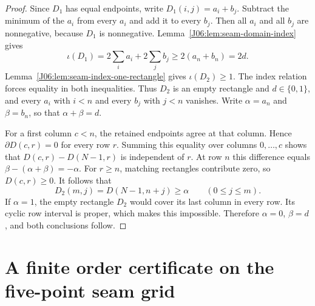 \documentclass[11pt,oneside]{report}
\theoremstyle{definition}
\numberwithin{equation}{section}
\begin{document}
\begin{proof}
Since $D_1$ has equal endpoints, write $D_1(i,j)=a_i+b_j$.
Subtract the minimum of the $a_i$ from every $a_i$ and add it to
every $b_j$. Then all $a_i$ and all $b_j$ are nonnegative, because
$D_1$ is nonnegative. Lemma~\ref{J06:lem:seam-domain-index} gives
\[
 \iota(D_1)=2\sum_i a_i+2\sum_j b_j
 \ge2(a_n+b_n)=2d.
\]
Lemma~\ref{J06:lem:seam-index-one-rectangle} gives $\iota(D_2)\ge1$.
The index relation forces equality in both inequalities. Thus $D_2$
is an empty rectangle and $d\in\{0,1\}$, and every $a_i$ with $i<n$
and every $b_j$ with $j<n$ vanishes. Write $\alpha=a_n$ and
$\beta=b_n$, so that $\alpha+\beta=d$.

For a first column $c<n$, the retained endpoints agree at that column.
Hence $\partial D(c,r)=0$ for every row $r$. Summing this equality
over columns $0,\ldots,c$ shows that
$D(c,r)-D(N-1,r)$ is independent of $r$.
At row $n$ this difference equals $\beta-(\alpha+\beta)=-\alpha$.
For $r\ge n$, matching rectangles contribute zero, so
$D(c,r)\ge0$. It follows that
\[
 D_2(m,j)=D(N-1,n+j)\ge\alpha\qquad(0\le j\le m).
\]
If $\alpha=1$, the empty rectangle $D_2$ would cover its last column
in every row. Its cyclic row interval is proper, which makes this
impossible. Therefore $\alpha=0$, $\beta=d$, and both conclusions
follow.
\end{proof}

\section{A finite order certificate on the five-point seam grid}
\end{document}
